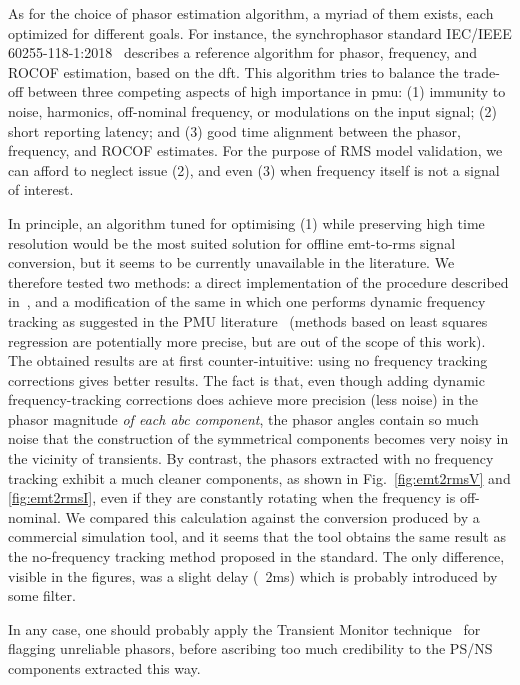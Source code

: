 \documentclass[11pt, a4paper, twoside, titlepage]{article}
\begin{document}
As for the choice of phasor estimation algorithm, a myriad of them exists, each
optimized for different goals.  For instance, the synchrophasor standard
IEC/IEEE 60255-118-1:2018~\cite{pmu-int} describes a reference algorithm for
phasor, frequency, and ROCOF estimation, based on the \ac{dft}. This algorithm
tries to balance the trade-off between three competing aspects of high
importance in \ac{pmu}: (1) immunity to noise, harmonics, off-nominal frequency,
or modulations on the input signal; (2) short reporting latency; and (3) good
time alignment between the phasor, frequency, and ROCOF estimates. For the
purpose of RMS model validation, we can afford to neglect issue (2), and even
(3) when frequency itself is not a signal of interest.

In principle, an algorithm tuned for optimising (1) while preserving high time
resolution would be the most suited solution for offline \ac{emt}-to-\ac{rms}
signal conversion, but it seems to be currently unavailable in the
literature. We therefore tested two methods: a direct implementation of the
procedure described in~\cite{iec27-2}, and a modification of the same in which
one performs dynamic frequency tracking as suggested in the PMU
literature~\cite{PhadkeThorp17,Wang04} (methods based on least squares
regression are potentially more precise, but are out of the scope of this
work). The obtained results are at first counter-intuitive: using no frequency
tracking corrections gives better results. The fact is that, even though adding
dynamic frequency-tracking corrections does achieve more precision (less noise)
in the phasor magnitude \emph{of each abc component}, the phasor angles contain
so much noise that the construction of the symmetrical components becomes very
noisy in the vicinity of transients. By contrast, the phasors extracted with no
frequency tracking exhibit a much cleaner components, as shown in
Fig.~\ref{fig:emt2rmsV} and \ref{fig:emt2rmsI}, even if they are constantly
rotating when the frequency is off-nominal. We compared this calculation against
the conversion produced by a commercial simulation tool, and it seems that the
tool obtains the same result as the no-frequency tracking method proposed in the
standard. The only difference, visible in the figures, was a slight delay (~2ms)
which is probably introduced by some filter.

In any case, one should probably apply the Transient Monitor
technique~\cite{PhadkeThorp17,Wang04} for flagging unreliable phasors, before
ascribing too much credibility to the PS/NS components extracted this way.
\end{document}

